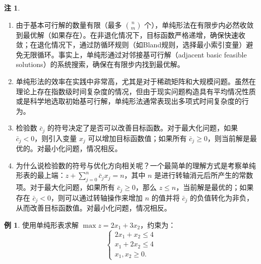 \documentclass[12pt]{article}
\theoremstyle{plain}
\theoremstyle{definition}
\newtheorem{rmk}{注}[subsection]
\newtheorem{exm}{例}[subsection]
\begin{document}
\begin{rmk}
    \begin{enumerate}
        \item 由于基本可行解的数量有限（最多 $\binom{n}{m}$ 个），单纯形法在有限步内必然收敛到最优解（如果存在）。在非退化情况下，目标函数严格递增，确保快速收敛；在退化情况下，通过防循环规则（如Bland规则，选择最小索引变量）避免无限循环。事实上，单纯形通过对邻接基可行解（adjacent basic feasible solutions）的系统搜索，确保在有限步内找到最优解。
        \item 单纯形法的效率在实践中非常高，尤其是对于稀疏矩阵和大规模问题。虽然在理论上存在指数级时间复杂度的情况，但由于现实问题构造具有平均情况性质或是科学地选取初始基可行解，单纯形法通常表现出多项式时间复杂度的行为。
        \item 检验数 $\bar{c}_j$ 的符号决定了是否可以改善目标函数。对于最大化问题，如果 $\bar{c}_j < 0$，则引入变量 $x_j$ 可以增加目标函数值；如果所有 $\bar{c}_j \geq 0$，则当前解是最优的。对最小化问题，情况相反。
        \item 为什么说检验数的符号与优化方向相关呢？一个最简单的理解方式是考察单纯形表的最上端：$z + \sum_{j=0}^n \bar{c}_j x_j = n$，其中 $n$ 是进行转轴消元后所产生的常数项。对于最大化问题，如果所有 $\bar{c}_j \geq 0$，那么 $z \leq n$，当前解是最优的；如果存在 $\bar{c}_j < 0$，则可以通过转轴操作来增加 $n$ 的值并将 $\bar{c}_j$ 的负值转化为非负，从而改善目标函数值。对最小化问题，情况相反。
    \end{enumerate}
\end{rmk}

\begin{exm}
    使用单纯形表求解 $\max z=2x_1+3x_2$，约束为：
    \[\begin{cases}
    2x_1 + x_2 \leq 4 \\
    x_1 + 2x_2 \leq 4 \\
    x_1, x_2 \geq 0.
    \end{cases}\]
\end{exm}
\end{document}
